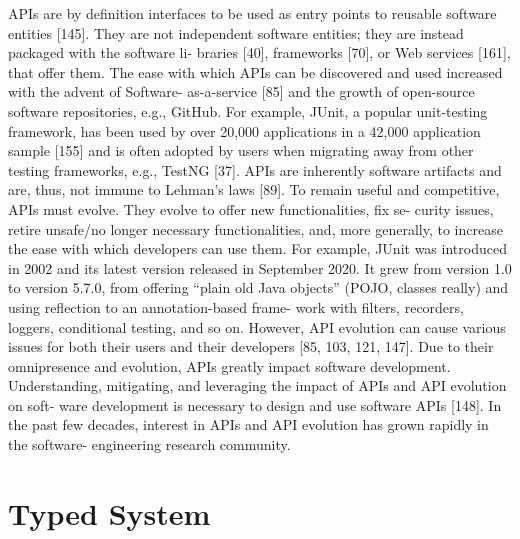 APIs are by definition interfaces to be used as entry points to reusable software entities [145].
They are not independent software entities; they are instead packaged with the software li-
braries [40], frameworks [70], or Web services [161], that offer them.
The ease with which APIs can be discovered and used increased with the advent of Software-
as-a-service [85] and the growth of open-source software repositories, e.g., GitHub. For example,
JUnit, a popular unit-testing framework, has been used by over 20,000 applications in a 42,000
application sample [155] and is often adopted by users when migrating away from other testing
frameworks, e.g., TestNG [37].
APIs are inherently software artifacts and are, thus, not immune to Lehman’s laws [89]. To
remain useful and competitive, APIs must evolve. They evolve to offer new functionalities, fix se-
curity issues, retire unsafe/no longer necessary functionalities, and, more generally, to increase
the ease with which developers can use them. For example, JUnit was introduced in 2002 and its
latest version released in September 2020. It grew from version 1.0 to version 5.7.0, from offering
“plain old Java objects” (POJO, classes really) and using reflection to an annotation-based frame-
work with filters, recorders, loggers, conditional testing, and so on. However, API evolution can
cause various issues for both their users and their developers [85, 103, 121, 147].
Due to their omnipresence and evolution, APIs greatly impact software development.
Understanding, mitigating, and leveraging the impact of APIs and API evolution on soft-
ware development is necessary to design and use software APIs [148].
In the past few decades, interest in APIs and API evolution has grown rapidly in the software-
engineering research community.

\section{Typed System} %
\label{sec:typed_languages}